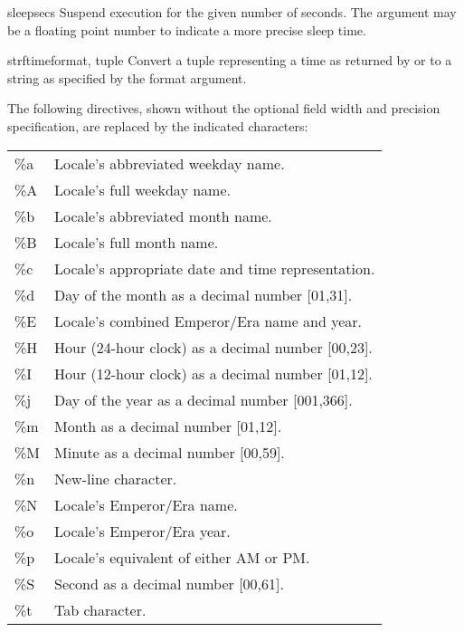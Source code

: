 \begin{funcdesc}{sleep}{secs}
Suspend execution for the given number of seconds.  The argument may
be a floating point number to indicate a more precise sleep time.
\end{funcdesc}

\begin{funcdesc}{strftime}{format, tuple}
Convert a tuple representing a time as returned by  or
 to a string as specified by the format argument.

      The following directives, shown without the optional field width and
      precision specification, are replaced by the indicated characters:

\begin{tabular}{lp{25em}}
           \%a  &      Locale's abbreviated weekday name. \\
           \%A  &      Locale's full weekday name. \\
           \%b  &      Locale's abbreviated month name. \\
           \%B  &      Locale's full month name. \\
           \%c  &      Locale's appropriate date and time representation. \\
           \%d  &      Day of the month as a decimal number [01,31]. \\
           \%E  &      Locale's combined Emperor/Era name and year. \\
           \%H  &      Hour (24-hour clock) as a decimal number [00,23]. \\
           \%I  &      Hour (12-hour clock) as a decimal number [01,12]. \\
           \%j  &      Day of the year as a decimal number [001,366]. \\
           \%m  &      Month as a decimal number [01,12]. \\
           \%M  &      Minute as a decimal number [00,59]. \\
           \%n  &      New-line character. \\
           \%N  &      Locale's Emperor/Era name. \\
           \%o  &      Locale's Emperor/Era year. \\
           \%p  &      Locale's equivalent of either AM or PM. \\
           \%S  &      Second as a decimal number [00,61]. \\
           \%t  &      Tab character. \\

\end{tabular}
\end{funcdesc}
